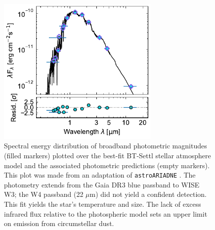 \documentclass{nature3}
\begin{document}
\begin{methods}
\begin{figure}[!t]
  \centering
  \includegraphics[width=0.7\textwidth]{figures/sf4.pdf}
  \caption{
    Spectral energy distribution of broadband photometric magnitudes
    (filled markers) plotted over the best-fit BT-Settl stellar
    atmosphere model \cite{Allard2012} and the associated photometric
    predictions (empty markers).  This plot was made from an
    adaptation of \texttt{astroARIADNE} \cite{Vines2022}.  The
    photometry extends from the Gaia DR3 blue passband to WISE W3;
    the W4 passband (22 $\mu$m) did not yield a confident detection.
    This fit yields the star's temperature and size.  The lack of
    excess infrared flux relative to the photospheric model sets an
    upper limit on emission from circumstellar dust.
    }
  \label{fig:sed}
\end{figure}


\end{methods}
\end{document}

